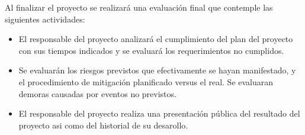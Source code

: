 \documentclass[
11pt, %
]{charter}
\begin{document}
Al finalizar el proyecto se realizará una evaluación final que contemple las siguientes actividades:
\begin{itemize}


\item El responsable del proyecto analizará el cumplimiento del plan del proyecto con sus tiempos indicados y se evaluará los requerimientos no cumplidos.
\item Se evaluarán los riesgos previstos que efectivamente se hayan manifestado, y el procedimiento de mitigación planificado versus el real. Se evaluaran demoras causadas por eventos no previstos.
\item El responsable del proyecto realiza una presentación pública del resultado del proyecto asi como del historial de su desarollo.
\end{itemize}
\end{document}
